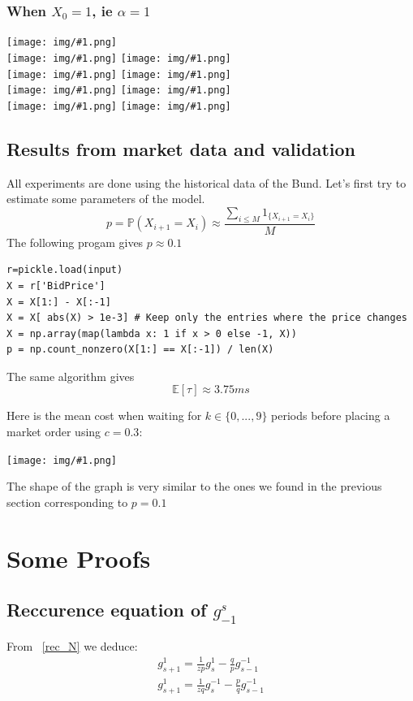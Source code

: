 \documentclass{article}
\newcommand{\g}[2]{g_{#1}^{#2}}
\newcommand{\IMG}[1] { \texttt{[image: img/\#1.png]} }
\begin{document}
\newpage

\subsubsection*{When $X_0 = 1$, ie $\alpha=1$}

\IMG{11} \\
\IMG{12}
\IMG{13} \\
\IMG{14}
\IMG{15} \\
\IMG{16}
\IMG{17} \\
\IMG{18}
\IMG{19} \\

\newpage

\subsection{Results from market data and validation}
All experiments are done using the historical data of the Bund. Let's first try to estimate some parameters of the model.
$$ p = \mathbb{P}(X_{i+1} = X_i)  \approx \frac{ \sum_{i \leq M} 1_{ \{X_{i+1} = X_i \} } }{M} $$
The following progam gives $p \approx 0.1$

\begin{verbatim}
r=pickle.load(input)
X = r['BidPrice']
X = X[1:] - X[:-1]
X = X[ abs(X) > 1e-3] # Keep only the entries where the price changes
X = np.array(map(lambda x: 1 if x > 0 else -1, X))
p = np.count_nonzero(X[1:] == X[:-1]) / len(X)
\end{verbatim}

The same algorithm gives $$\mathbb{E}[ \tau ] \approx 3.75 ms$$

Here is the mean cost when waiting for $k \in \{0, ... ,9 \}$ periods before placing a market order using $c=0.3$:

\IMG{esp_market}

The shape of the graph is very similar to the ones we found in the previous section corresponding to $p = 0.1$

\newpage

\appendix


\section{ Some Proofs }

\subsection{ Reccurence equation of $\g{-1}{s}$ }
From ~\ref{rec_N}  we deduce:
\begin{align*}
		\g{s+1}{1} = \frac{1}{z p} \g{s}{1} - \frac{q}{p} \g{s-1}{-1} \\
		\g{s+1}{1} = \frac{1}{ zq} \g{s}{-1} - \frac{p}{q} \g{s-1}{-1}
\end{align*}
\end{document}
